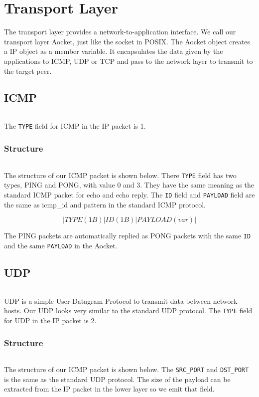 \chapter{Transport Layer}\label{ch:ch5label}

The transport layer provides a network-to-application interface. We call our transport layer Aocket, just like the socket in POSIX. The Aocket object creates a IP object as a member variable. It encapsulates the data given by the applications to ICMP, UDP or TCP and pass to the network layer to transmit to the target peer.

\section{ICMP}
    \subparagraph{}
    The {\tt TYPE} field for ICMP in the IP packet is 1.

    \subsection{Structure}
        \subparagraph{}
        The structure of our ICMP packet is shown below. There {\tt TYPE} field has two types, PING and PONG, with value 0 and 3. They have the same meaning as the standard ICMP packet for echo and echo reply. The {\tt ID} field and {\tt PAYLOAD} field are the same as icmp\_id and pattern in the standard ICMP protocol.

        $$ | TYPE(1B) | ID(1B) | PAYLOAD(var) |$$
        
    The PING packets are automatically replied as PONG packets with the same {\tt ID} and the same {\tt PAYLOAD} in the Aocket.

\section{UDP}
    \subparagraph{}
    UDP is a simple User Datagram Protocol to transmit data between network hosts. Our UDP looks very similar to the standard UDP protocol. The {\tt TYPE} field for UDP in the IP packet is 2.

    \subsection{Structure}
        \subparagraph{}
        The structure of our ICMP packet is shown below. The {\tt SRC\_PORT} and {\tt DST\_PORT} is the same as the standard UDP protocol. The size of the payload can be extracted from the IP packet in the lower layer so we emit that field.
        
